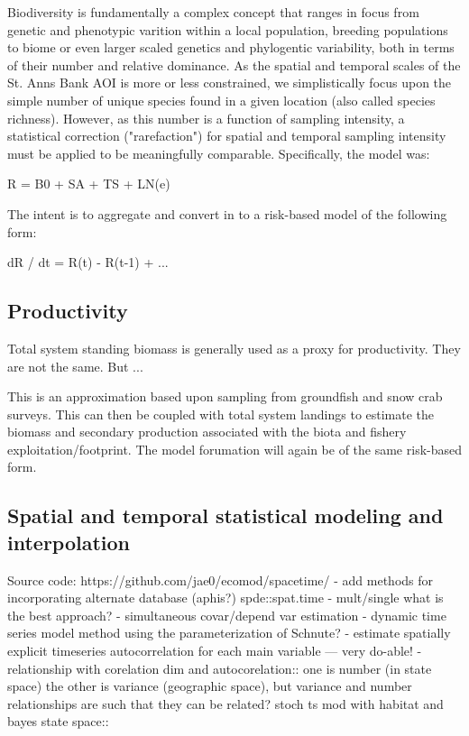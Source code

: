 \documentclass[letterpaper,portrait,11pt]{scrartcl}
\numberwithin{equation}{section}		%
\numberwithin{figure}{section}			%
\numberwithin{table}{section}				%
\begin{document}
\begin{itemize*}
Biodiversity is fundamentally a complex concept that ranges in focus from genetic and phenotypic varition within a local population, breeding populations to biome or even larger scaled genetics and phylogentic variability, both in terms of their number and relative dominance. As the spatial and temporal scales of the St. Anns Bank AOI is more or less constrained, we simplistically focus upon the simple number of unique species found in a given location (also called species richness). However, as this number is a function of sampling intensity, a statistical correction ("rarefaction") for spatial and temporal sampling intensity must be applied to be meaningfully comparable. Specifically, the model was:

R = B0 + SA + TS + LN(e)

The intent is to aggregate and convert in to a risk-based model of the following form: 

dR / dt = R(t) - R(t-1) +  ... 




\subsection{Productivity}

Total system standing biomass is generally used as a proxy for productivity. They are not the same. But ...

This is an approximation based upon sampling from groundfish and snow crab surveys. This can then be coupled with total system landings to estimate the biomass and secondary production associated with the biota and fishery exploitation/footprint. The model forumation will again be of the same risk-based form.



\subsection{Spatial and temporal statistical modeling and interpolation}
Source code: https://github.com/jae0/ecomod/spacetime/
- add methods for incorporating alternate database (aphis?)
	spde::spat.time
- mult/single what is the best approach?
- simultaneous covar/depend var estimation
- dynamic time series model method using the parameterization of Schnute?
- estimate spatially explicit timeseries autocorrelation for each main variable --- very do-able!
- relationship with corelation dim and autocorelation:: one is number (in state space) the other is variance (geographic space), but variance and number relationships are such that they can be related?
	stoch ts mod with habitat and bayes state space::



\end{itemize*}
\end{document}
